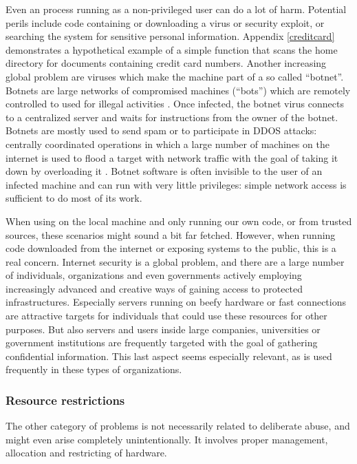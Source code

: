 Even an \R process running as a non-privileged user can do a lot of harm.
Potential perils include code containing or downloading a virus or security
exploit, or searching the system for sensitive personal information. Appendix
\ref{creditcard} demonstrates a hypothetical example of a simple function that
scans the home directory for documents containing credit card numbers. Another
increasing global problem are viruses which make the machine part of a so called
``botnet''. Botnets are large networks of compromised machines (``bots'') which
are remotely controlled to used for illegal activities
\citep{abu2006multifaceted}. Once infected, the botnet virus connects to a
centralized server and waits for instructions from the owner of the botnet.
Botnets are mostly used to send spam or to participate in DDOS attacks:
centrally coordinated operations in which a large number of machines on the
internet is used to flood a target with network traffic with the goal of taking
it down by overloading it \citep{mirkovic2004taxonomy}. Botnet software is often
invisible to the user of an infected machine and can run with very little
privileges: simple network access is sufficient to do most of its work.

When using \R on the local machine and only running our own code, or from
trusted sources, these scenarios might sound a bit far fetched. However, when
running code downloaded from the internet or exposing systems to the public,
this is a real concern. Internet security is a global problem, and there are a
large number of individuals, organizations and even governments actively
employing increasingly advanced and creative ways of gaining access to protected
infrastructures. Especially servers running on beefy hardware or fast
connections are attractive targets for individuals that could use these
resources for other purposes. But also servers and users inside large companies,
universities or government institutions are frequently targeted with the goal of
gathering confidential information. This last aspect seems especially relevant,
as \R is used frequently in these types of organizations.

\subsubsection{Resource restrictions}

The other category of problems is not necessarily related to deliberate abuse,
and might even arise completely unintentionally. It involves proper management,
allocation and restricting of hardware.

